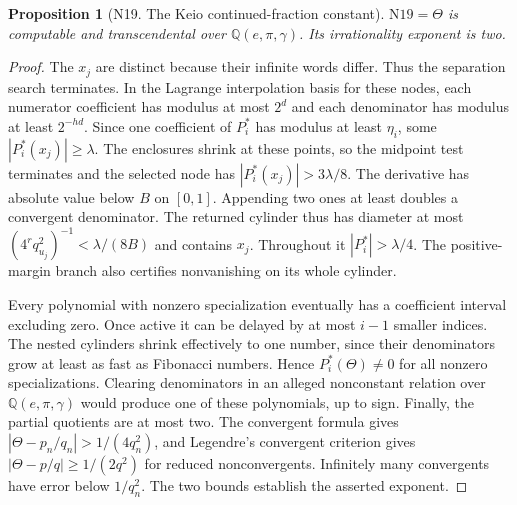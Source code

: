 \documentclass[11pt,a4paper]{article}
\newtheorem{proposition}[theorem]{Proposition}
\theoremstyle{definition}
\theoremstyle{remark}
\begin{document}
\par\hypertarget{cat-N19}{}\label{page:N19}
\begin{proposition}[N19. The Keio continued-fraction constant]
$\mathrm{N19}=\Theta$ is computable and transcendental over
$\mathbb Q(e,\pi,\gamma)$. Its irrationality exponent is two.
\end{proposition}
\begin{proof}
The $x_j$ are distinct because their infinite words differ. Thus the
separation search terminates. In the Lagrange interpolation basis for
these nodes, each numerator coefficient has modulus at most $2^d$ and
each denominator has modulus at least $2^{-hd}$. Since one coefficient
of $P_i^*$ has modulus at least $\eta_i$, some $|P_i^*(x_j)|\ge\lambda$.
The enclosures shrink at these points, so the midpoint test terminates
and the selected node has $|P_i^*(x_j)|>3\lambda/8$. The derivative
has absolute value below $B$ on $[0,1]$. Appending two ones at least
doubles a convergent denominator. The returned cylinder thus has
diameter at most $(4^rq_{u_j}^2)^{-1}<\lambda/(8B)$ and contains $x_j$.
Throughout it $|P_i^*|>\lambda/4$. The positive-margin branch also
certifies nonvanishing on its whole cylinder.

Every polynomial with nonzero specialization eventually has a
coefficient interval excluding zero. Once active it can be delayed
by at most $i-1$ smaller indices. The nested cylinders shrink
effectively to one number, since their denominators grow at least
as fast as Fibonacci numbers. Hence $P_i^*(\Theta)\ne0$ for all
nonzero specializations. Clearing denominators in an alleged
nonconstant relation over $\mathbb Q(e,\pi,\gamma)$ would produce
one of these polynomials, up to sign. Finally, the partial
quotients are at most two. The convergent formula gives
$|\Theta-p_n/q_n|>1/(4q_n^2)$, and Legendre's convergent criterion gives
$|\Theta-p/q|\ge1/(2q^2)$ for reduced nonconvergents. Infinitely
many convergents have error below $1/q_n^2$. The two bounds establish
the asserted exponent.
\end{proof}
\end{document}
